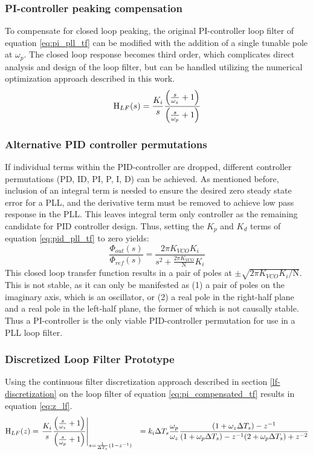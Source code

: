 		\subsubsection{PI-controller peaking compensation}\label{comp_pi_pll_lf}
			 To compensate for closed loop peaking, the original PI-controller loop filter of equation \ref{eq:pi_pll_tf} can be modified with the addition of a single tunable pole at $\omega_p$. The closed loop response becomes third order, which complicates direct analysis and design of the loop filter, but can be handled utilizing the numerical optimization approach described in this work.
			\begin{equation} \label{eq:pi_compensated_tf}
				\textnormal{H}_{LF}(s) = \frac{K_i}{s}\frac{\left(\frac{s}{\omega_z} + 1\right)}{\left(\frac{s}{\omega_p} + 1\right)}
			\end{equation}

		\subsubsection{Alternative PID controller permutations} \label{other_pid}
			If individual terms within the PID-controller are dropped, different controller permutations (PD, ID, PI, P, I, D) can be achieved. As mentioned before, inclusion of an integral term is needed to ensure the desired zero steady state error for a PLL, and the derivative term must be removed to achieve low pass response in the PLL. This leaves integral term only controller as the remaining candidate for PID controller design. Thus, setting the $K_p$ and $K_d$ terms of equation \ref{eq:pid_pll_tf} to zero yields:
			\begin{equation}
				\frac{\Phi_{out}(s)}{\Phi_{ref}(s)} = \frac{2\pi K_{VCO}K_i}{s^2 + \frac{2\pi K_{VCO}}{\mathrm{N}}K_i}
			\end{equation}
			This closed loop transfer function results in a pair of poles at $\pm\sqrt{2\pi K_{VCO}K_i/\mathrm{N}}$. This is not stable, as it can only be manifested as (1) a pair of poles on the imaginary axis, which is an oscillator, or (2) a real pole in the right-half plane and a real pole in the left-half plane, the former of which is not causally stable. Thus a PI-controller is the only viable PID-controller permutation for use in a PLL loop filter. 


	\subsubsection{Discretized Loop Filter Prototype}\label{disc_lf_comp_pi}
		Using the continuous filter discretization approach described in section \ref{lf-discretization} on the loop filter of equation \ref{eq:pi_compensated_tf} results in equation \ref{eq:z_lf}.
		\begin{align}
			\textnormal{H}_{LF}(z) & = \left.\frac{K_i}{s}\frac{\left(\frac{s}{\omega_z} + 1\right)}{\left(\frac{s}{\omega_p} + 1\right)}\right\vert_{s=\frac{1}{\Delta T_s}(1-z^{-1})}
			&= k_i\Delta T_s\frac{\omega_p}{\omega_z}\frac{(1+\omega_z\Delta T_s)-z^{-1}}{(1+\omega_p\Delta T_s) - z^{-1}(2+\omega_p\Delta T_s) + z^{-2}}\label{eq:z_lf}
		\end{align}

